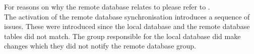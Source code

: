 For reasons on why the remote database relates to \launcher please refer to .\\

The activation of the remote database synchronisation introduces a sequence of issues. These were introduced since the local database and the remote database tables did not match. The group responsible for the local database did make changes which they did not notify the remote database group.
